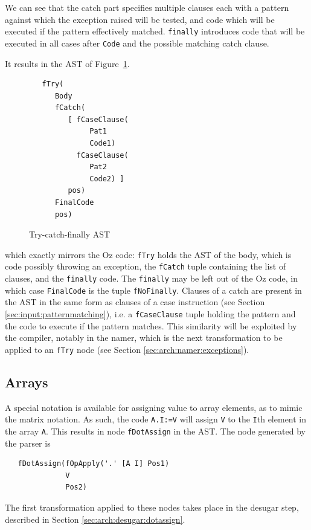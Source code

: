 \documentclass[a4paper]{memoir}
\begin{document}
We can see that the catch part specifies multiple clauses each with a pattern
against which the exception raised will be tested, and code which will be
executed if the pattern effectively matched. \lstinline!finally! introduces code
that will be executed in all cases after \lstinline!Code! and the possible
matching catch clause.

It results in the AST of Figure~\ref{fig:tryast}.
\begin{figure}[h]
\begin{lstlisting}
   fTry(
      Body
      fCatch(
         [ fCaseClause(
              Pat1
              Code1)
           fCaseClause(
              Pat2
              Code2) ]
         pos)
      FinalCode
      pos)
\end{lstlisting}
\caption{Try-catch-finally AST}
\label{fig:tryast}
\end{figure}


which exactly mirrors the Oz code: \lstinline!fTry! holds the AST of the body,
which is code possibly throwing an exception, the \lstinline!fCatch! tuple containing the list of
clauses, and the \lstinline!finally! code. The \lstinline!finally! may be left
out of the Oz code, in which case \lstinline!FinalCode! is the tuple
\lstinline!fNoFinally!.
Clauses of a catch are present in the AST in the same form as clauses of a case
instruction (see Section \ref{sec:input:patternmatching}), i.e. a
\lstinline!fCaseClause! tuple holding the pattern and the code to execute if
the pattern matches. This similarity will be exploited by the compiler, notably
in the namer, which is the next transformation to be applied to an
\lstinline!fTry! node (see Section \ref{sec:arch:namer:exceptions}).


\subsection{Arrays}
A special notation is available for assigning value to array elements, as to mimic the
matrix notation. As such, the code \lstinline!A.I:=V! will assign \lstinline!V!
to the \lstinline!I!th element in the array \lstinline!A!.
This results in node \lstinline!fDotAssign! in the AST. The node generated by
the parser is
\begin{lstlisting}
   fDotAssign(fOpApply('.' [A I] Pos1) 
              V 
              Pos2) 
\end{lstlisting}
The first transformation applied to these nodes takes place in the desugar step,
described in Section \ref{sec:arch:desugar:dotassign}.
\end{document}
